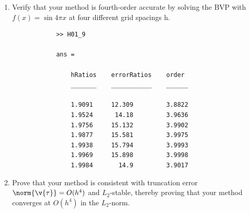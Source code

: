 \documentclass[11pt, oneside]{article}
\begin{document}
\begin{enumerate}
    \item %
        Verify that your method is fourth-order accurate by solving the BVP with
        $f(x) = \sin{4\pi x}$ at four different grid spacings h.

        
        \begin{verbatim}
            >> H01_9

            ans = 

                hRatios    errorRatios    order 
                _______    ___________    ______

                1.9091     12.309         3.8822
                1.9524      14.18         3.9636
                1.9756     15.132         3.9902
                1.9877     15.581         3.9975
                1.9938     15.794         3.9993
                1.9969     15.898         3.9998
                1.9984       14.9         3.9017
        \end{verbatim}

    \item %
        Prove that your method is consistent with truncation error
        $\norm{\v{\tau}} = O(h^4)$ and $L_2$-stable, thereby proving that
        your method converges at $O(h^4)$ in the $L_2$-norm.

\end{enumerate}
\end{document}
